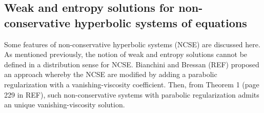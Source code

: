 \documentclass[times,doublespace]{fldauth}%
\begin{document}

\subsection{Weak and entropy solutions for non-conservative hyperbolic systems of equations}\label{sec:NCSE-theorems}
%
Some features of non-conservative hyperbolic systems (NCSE) are discussed here. As mentioned previously, 
the notion of weak and entropy solutions cannot be defined in a distribution sense for NCSE. 
Bianchini and Bressan (REF) proposed an approach whereby the NCSE are modified by adding a parabolic regularization 
with a vanishing-viscosity coefficient. Then, from Theorem 1 (page 229 in REF), such non-conservative systems with 
parabolic regularization admits an unique vanishing-viscosity solution.
%
\end{document}

